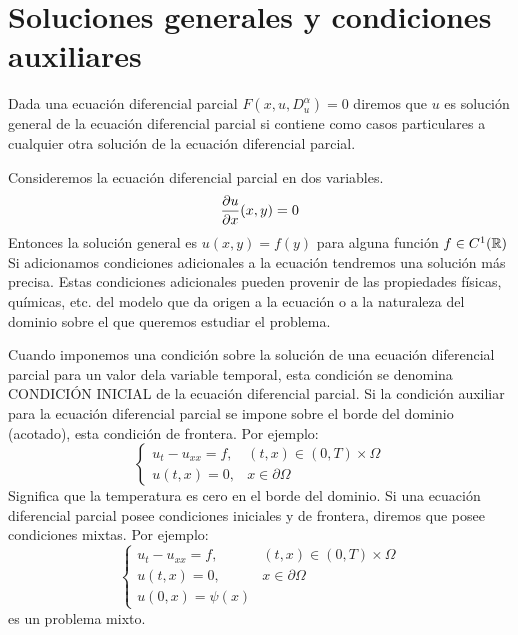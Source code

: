 \section{Soluciones generales y condiciones auxiliares}
Dada una ecuación diferencial parcial $F(x,u,D^{\alpha}_u)=0$ diremos que $u$ es solución general de la ecuación diferencial parcial si contiene como casos particulares a cualquier otra solución de la ecuación diferencial parcial.
\begin{Ejm}
    Consideremos la ecuación diferencial parcial en dos variables.
    $$\frac{\partial u}{\partial x}(x,y)=0$$
    Entonces la solución general es $u(x,y)=f(y)$ para alguna función $f\in C^1({\mathbb{R}})$\\
    Si adicionamos condiciones adicionales a la ecuación tendremos una solución más precisa. Estas condiciones adicionales pueden provenir de las propiedades físicas, químicas, etc. del modelo que da origen a la ecuación o a la naturaleza del dominio sobre el que queremos estudiar el problema.
\end{Ejm}
Cuando imponemos una condición sobre la solución de una ecuación diferencial parcial para un valor dela variable temporal, esta condición se denomina CONDICIÓN INICIAL de la ecuación diferencial parcial.
Si la condición auxiliar para la ecuación diferencial parcial se impone sobre el borde del dominio (acotado), esta condición de frontera. Por ejemplo:
$$
\begin{cases}
    u_t-u_{xx}=f,
    & \mbox{$(t,x)\in (0,T)\times\Omega$}\\
    u(t,x)=0, & \mbox{$x\in\partial\Omega$}
\end{cases}
$$
Significa que la temperatura es cero en el borde del dominio. Si una ecuación diferencial parcial posee condiciones iniciales y de frontera, diremos que posee condiciones mixtas. Por ejemplo:$$
\begin{cases}
    u_t-u_{xx}=f,
    & \mbox{$(t,x)\in (0,T)\times\Omega$}\\
    u(t,x)=0, & \mbox{$x\in\partial\Omega$}\\
    u(0,x)=\psi(x)
\end{cases}
$$
es un problema mixto.